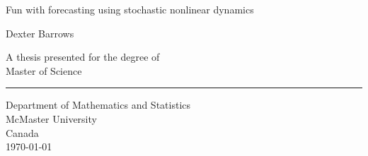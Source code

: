 \begin{titlepage}
	
	\vspace{4cm}

	\Large
	{\uppercase Fun with forecasting using stochastic nonlinear dynamics}

	\large
	\vspace{4cm}

	Dexter Barrows

	\vfill

	A thesis presented for the degree of \\
	Master of Science

	\noindent\rule[0.5ex]{0.5\linewidth}{1pt}

	Department of Mathematics and Statistics \\
	McMaster University \\
	Canada \\
	\today


\end{titlepage}